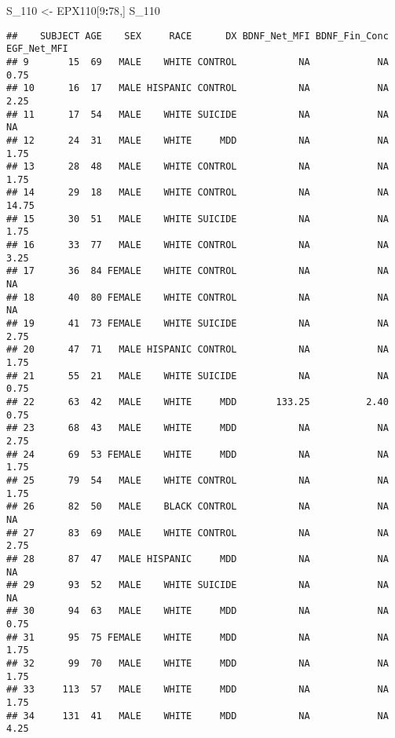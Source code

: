 \documentclass[]{article}
\newenvironment{Shaded}{\begin{snugshade}}{\end{snugshade}}
\newcommand{\DecValTok}[1]{\textcolor[rgb]{0.00,0.00,0.81}{#1}}
\newcommand{\NormalTok}[1]{#1}
\newcommand{\OperatorTok}[1]{\textcolor[rgb]{0.81,0.36,0.00}{\textbf{#1}}}
\newcommand{\StringTok}[1]{\textcolor[rgb]{0.31,0.60,0.02}{#1}}
\begin{document}
\begin{Shaded}
\begin{Highlighting}[]
\NormalTok{S_}\DecValTok{110}\NormalTok{ <-}\StringTok{ }\NormalTok{EPX110[}\DecValTok{9}\OperatorTok{:}\DecValTok{78}\NormalTok{,]}
\NormalTok{S_}\DecValTok{110}
\end{Highlighting}
\end{Shaded}

\begin{verbatim}
##    SUBJECT AGE    SEX     RACE      DX BDNF_Net_MFI BDNF_Fin_Conc EGF_Net_MFI
## 9       15  69   MALE    WHITE CONTROL           NA            NA        0.75
## 10      16  17   MALE HISPANIC CONTROL           NA            NA        2.25
## 11      17  54   MALE    WHITE SUICIDE           NA            NA          NA
## 12      24  31   MALE    WHITE     MDD           NA            NA        1.75
## 13      28  48   MALE    WHITE CONTROL           NA            NA        1.75
## 14      29  18   MALE    WHITE CONTROL           NA            NA       14.75
## 15      30  51   MALE    WHITE SUICIDE           NA            NA        1.75
## 16      33  77   MALE    WHITE CONTROL           NA            NA        3.25
## 17      36  84 FEMALE    WHITE CONTROL           NA            NA          NA
## 18      40  80 FEMALE    WHITE CONTROL           NA            NA          NA
## 19      41  73 FEMALE    WHITE SUICIDE           NA            NA        2.75
## 20      47  71   MALE HISPANIC CONTROL           NA            NA        1.75
## 21      55  21   MALE    WHITE SUICIDE           NA            NA        0.75
## 22      63  42   MALE    WHITE     MDD       133.25          2.40        0.75
## 23      68  43   MALE    WHITE     MDD           NA            NA        2.75
## 24      69  53 FEMALE    WHITE     MDD           NA            NA        1.75
## 25      79  54   MALE    WHITE CONTROL           NA            NA        1.75
## 26      82  50   MALE    BLACK CONTROL           NA            NA          NA
## 27      83  69   MALE    WHITE CONTROL           NA            NA        2.75
## 28      87  47   MALE HISPANIC     MDD           NA            NA          NA
## 29      93  52   MALE    WHITE SUICIDE           NA            NA          NA
## 30      94  63   MALE    WHITE     MDD           NA            NA        0.75
## 31      95  75 FEMALE    WHITE     MDD           NA            NA        1.75
## 32      99  70   MALE    WHITE     MDD           NA            NA        1.75
## 33     113  57   MALE    WHITE     MDD           NA            NA        1.75
## 34     131  41   MALE    WHITE     MDD           NA            NA        4.25

\end{verbatim}
\end{document}
